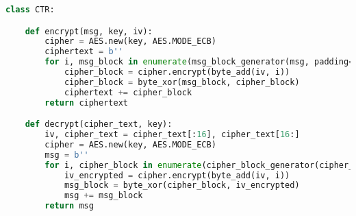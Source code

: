 \begin{lstlisting}[language = Python]
class CTR:

    def encrypt(msg, key, iv):
        cipher = AES.new(key, AES.MODE_ECB)
        ciphertext = b''
        for i, msg_block in enumerate(msg_block_generator(msg, padding=False)):
            cipher_block = cipher.encrypt(byte_add(iv, i))
            cipher_block = byte_xor(msg_block, cipher_block)
            ciphertext += cipher_block
        return ciphertext

    def decrypt(cipher_text, key):
        iv, cipher_text = cipher_text[:16], cipher_text[16:]
        cipher = AES.new(key, AES.MODE_ECB)
        msg = b''
        for i, cipher_block in enumerate(cipher_block_generator(cipher_text)):
            iv_encrypted = cipher.encrypt(byte_add(iv, i))
            msg_block = byte_xor(cipher_block, iv_encrypted)
            msg += msg_block
        return msg

\end{lstlisting}